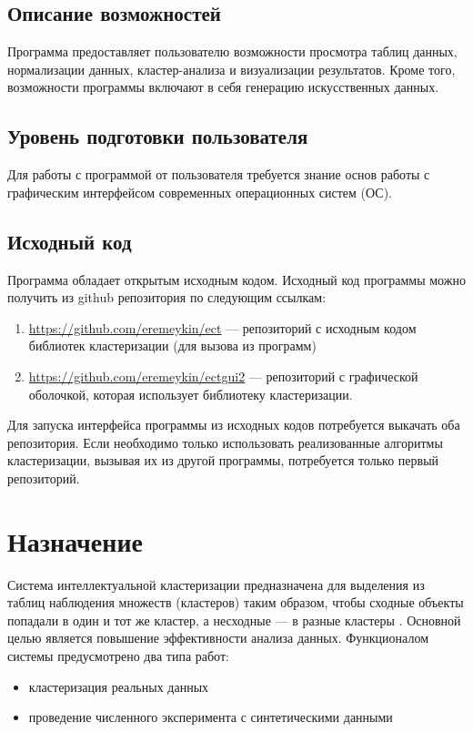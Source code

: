\documentclass[12pt,tikz]{instruction}
\begin{document}
\subsection{Описание возможностей} 
Программа \SysName предоставляет пользователю возможности просмотра таблиц данных, нормализации данных, кластер-анализа и визуализации результатов. Кроме того, возможности программы включают в себя генерацию искусственных данных. 

\subsection{Уровень подготовки пользователя}
Для работы с программой от пользователя требуется знание основ работы с графическим интерфейсом современных операционных систем (ОС).

\subsection{Исходный код}
Программа обладает открытым исходным кодом. Исходный код программы можно получить из github репозитория по следующим ссылкам:
\begin{enumerate}
	\item \url{https://github.com/eremeykin/ect} --- репозиторий с исходным кодом библиотек кластеризации (для вызова из \Python программ)
	\item \url{https://github.com/eremeykin/ectgui2} --- репозиторий с графической оболочкой, которая использует библиотеку кластеризации.
\end{enumerate}
Для запуска  интерфейса программы из исходных кодов потребуется выкачать оба репозитория. Если необходимо только использовать реализованные алгоритмы кластеризации, вызывая их из другой \Python программы, потребуется только первый репозиторий.

\section{Назначение}

Система интеллектуальной кластеризации \SysName предназначена для выделения из таблиц наблюдения множеств (кластеров) таким образом, чтобы сходные объекты попадали в один и тот же кластер, а несходные — в разные кластеры \cite{data-science}. Основной целью \SysName является повышение эффективности анализа данных. Функционалом системы предусмотрено два типа работ:
\begin{itemize}
	\item кластеризация реальных данных
	\item проведение численного эксперимента с синтетическими данными
\end{itemize}
\end{document}
